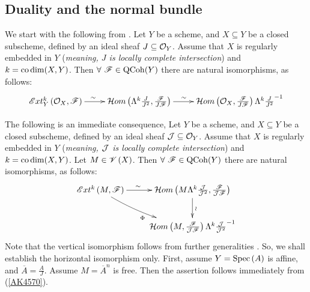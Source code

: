\documentclass[12pt]{article}
\begin{document}
\subsection{Duality and the normal bundle} %
We start with the following from  \cite[Chap 1, Thm 4.5]{AK70}.
\bT\label{AK4570}{\rm 
Let $Y$ be a scheme, and $X\subseteq Y$ be a closed subscheme, defined by an ideal sheaf $J \subseteq {\mathcal{O}}_Y$. Assume that $X$ is regularly embedded in $Y$ ({\it meaning, $J$ is locally complete intersection}) and $k=\mathrm{co}\dim(X, Y)$. Then $\forall ~{\mathscr {F}}\in \mathrm{QCoh}(Y)$ there are natural isomorphisms, as follows:
$$
\diagram
{\SE}xt^k_Y\LRf{{\CO}_X, {\SF}} \ar[r]^{\sim\quad} & {\CH}om\LRf{\Lambda^k\frac{J}{J^2}, \frac{\SF}{J{\SF}}}\ar[r]^{\sim\quad~}
& {\CH}om\LRf{{\CO}_X, \frac{\SF}{J{\SF}}}\Lambda^k\frac{J}{J^2}^{-1}\\
\enddiagram
$$
}
\eT

\vspace{3mm}
The following is an immediate consequence,
\bC\label{1316Thinht}{\rm 
Let $Y$ be a scheme, and $X\subseteq Y$ be a closed subscheme, defined by an ideal sheaf ${\mathcal{J}} \subseteq {\mathcal{O}}_Y$. Assume that $X$ is regularly embedded in $Y$ ({\it meaning, ${\mathcal{J}}$ is locally complete intersection}) and 
$k=\mathrm{co}\dim(X, Y)$. 
 Let $M\in {\mathscr {V}}\left( X\right)$.  Then $\forall ~{\mathscr {F}}\in \mathrm{QCoh}(Y)$ there are natural isomorphisms, as follows:
$$
\diagram
{\SE}xt^k\LRf{M, {\SF}} \ar[r]^{\sim\qquad} \ar@/_/[dr]_{\Phi}& {\CH}om\LRf{M\Lambda^k\frac{{\CJ}}{{\CJ}^2}, \frac{\SF}{{\CJ}{\SF}}}\ar[d]^{\wr}\\
& {\CH}om\LRf{M, \frac{\SF}{{\CJ}{\SF}}}\Lambda^k\frac{{\CJ}}{{\CJ}^2}^{-1}\\
\enddiagram
$$
}
\eC
\pf Note that the vertical isomorphism follows from further generalities \cite[pp 235]{H77}. So, we shall establish the horizontal isomorphism only. 
First, assume $Y=\mathrm{Spec}\left(A\right)$ is affine, and $\overline{A}=\frac{A}{J}$. Assume $M=\overline{A}^n$ is free. Then the assertion follows immediately from (\ref{AK4570}). 
\end{document}
